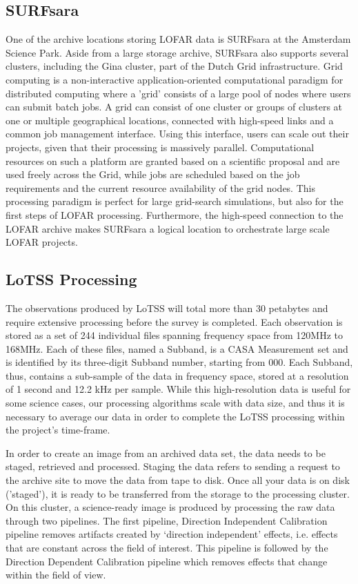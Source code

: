 \subsection{SURFsara} 

One of the archive locations storing LOFAR data is SURFsara at the Amsterdam Science Park. Aside from a large storage archive, SURFsara also supports several clusters, including the Gina cluster, part of the Dutch Grid infrastructure. Grid computing is a non-interactive application-oriented computational paradigm for distributed computing where a 'grid' consists of a large pool of nodes where users can submit batch jobs. A grid can consist of one cluster or groups of clusters at one or multiple geographical locations, connected with high-speed links and a common job management interface. Using this interface, users can scale out their projects, given that their processing is massively parallel. Computational resources on such a platform are granted based on a scientific proposal and are used freely across the Grid, while jobs are scheduled based on the job requirements and the current resource availability of the grid nodes. This processing paradigm is perfect for large grid-search simulations, but also for the first steps of LOFAR processing. Furthermore, the high-speed connection to the LOFAR archive makes SURFsara a logical location to orchestrate large scale LOFAR projects.


\subsection{LoTSS Processing}

The observations produced by LoTSS will total more than 30 petabytes and require extensive processing before the survey is completed. Each observation is stored as a set of 244 individual files spanning frequency space from 120MHz to 168MHz. Each of these files, named a Subband, is a CASA Measurement set and is identified by its three-digit Subband number, starting from 000. Each Subband, thus, contains a sub-sample of the data in frequency space, stored at a resolution of 1 second and 12.2 kHz per sample. While this high-resolution data is useful for some science cases, our processing algorithms scale with data size, and thus it is necessary to average our data in order to complete the LoTSS processing within the project's time-frame. 

In order to create an image from an archived data set, the data needs to be staged, retrieved and processed. Staging the data refers to sending a request to the archive site to move the data from tape to disk. Once all your data is on disk ('staged'), it is ready to be transferred from the storage to the processing cluster. On this cluster, a science-ready image is produced by processing the raw data through two pipelines. The first pipeline, Direction Independent Calibration pipeline removes artifacts created by `direction independent' effects, i.e. effects that are constant across the field of interest. This pipeline is followed by the Direction Dependent Calibration pipeline which removes effects that change within the field of view.
 
